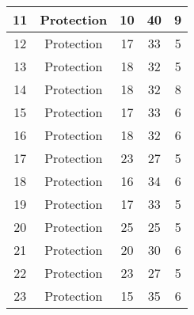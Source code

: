 \documentclass[results.tex]{subfiles}
\begin{document}
\begin{center}
\begin{tabular}{| c || c | c | c | c |}
            \hline
            11                      & Protection                   & 10                     & 40                      & 9                    \\
            \hline
            12                      & Protection                   & 17                     & 33                      & 5                    \\
            \hline
            13                      & Protection                   & 18                     & 32                      & 5                    \\
            \hline
            14                      & Protection                   & 18                     & 32                      & 8                    \\
            \hline
            15                      & Protection                   & 17                     & 33                      & 6                    \\
            \hline
            16                      & Protection                   & 18                     & 32                      & 6                    \\
            \hline
            17                      & Protection                   & 23                     & 27                      & 5                    \\
            \hline
            18                      & Protection                   & 16                     & 34                      & 6                    \\
            \hline
            19                      & Protection                   & 17                     & 33                      & 5                    \\
            \hline
            20                      & Protection                   & 25                     & 25                      & 5                    \\
            \hline
            21                      & Protection                   & 20                     & 30                      & 6                    \\
            \hline
            22                      & Protection                   & 23                     & 27                      & 5                    \\
            \hline
            23                      & Protection                   & 15                     & 35                      & 6                    \\

\end{tabular}
\end{center}
\end{document}
